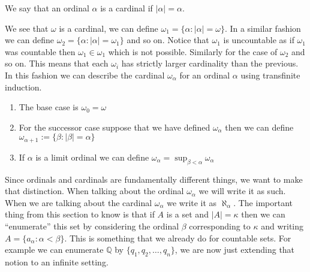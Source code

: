 \begin{defn}[Cardinal]
  We say that an ordinal $\alpha$ is a cardinal if $|\alpha| = \alpha$.
\end{defn}

We see that $\omega$ is a cardinal, we can define $\omega_1 = \{\alpha:
|\alpha| = \omega\}$. In a similar fashion we can define $\omega_{2}
= \{\alpha: |\alpha| = \omega_{1}\}$ and so on. Notice that $\omega_1$ is
uncountable as if $\omega_1$ was countable then $\omega_1 \in \omega_1$ which
is not possible. Similarly for the case of $\omega_2$ and so on. This means
that each $\omega_{i}$ has strictly larger cardinality than the previous. In
this fashion we can describe the cardinal $\omega_{\alpha}$ for an ordinal
$\alpha$ using transfinite induction.
\begin{enumerate}
  \item The base case is $\omega_0 = \omega$
  \item For the successor case suppose that we have defined $\omega_{\alpha}$ 
    then we can define $\omega_{\alpha + 1} := \{\beta: |\beta| = \alpha\} $
  \item If $\alpha$ is a limit ordinal we can define $\omega_{\alpha}
    = \sup_{\beta < \alpha} \omega_{\alpha}$
\end{enumerate}
Since ordinals and cardinals are fundamentally different things, we want to make that
distinction. When talking about the ordinal $\omega_{\alpha}$ we will write it
as such. When we are talking about the cardinal $\omega_{\alpha}$ we write it
as $\aleph_{\alpha}$. The important thing from this section to know is that if
$A$ is a set and $|A| = \kappa$ then we can ``enumerate'' this set by
considering the ordinal $\beta$ corresponding to $\kappa$ and writing $A
= \{a_{\alpha}: \alpha < \beta\}$. This is something that we already do for
countable sets. For example we can enumerate $\mathbb{Q}$ by $\{q_1, q_2,
\ldots, q_{n}\}$, we are now just extending that notion to an infinite setting.
